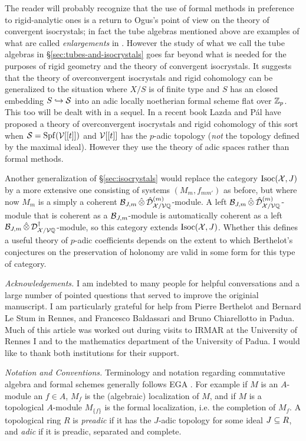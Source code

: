 \documentclass{article}
\theoremstyle{change}
\numberwithin{equation}{subsubsection}
\begin{document}
The reader will probably recognize that the use of formal methods in
preference to rigid-analytic ones is a return to Ogus's point of view
on the theory of convergent isocrystals; in fact the tube algebras
mentioned above are examples of what are called \textit{enlargements}
in \cite{ogus:1984}. However the study of what we call the tube
algebras in \S\ref{sec:tubes-and-isocrystals} goes far beyond what is
needed for the purposes of rigid geometry and the theory of convergent
isocrystals. It suggests that the theory of overconvergent isocrystals
and rigid cohomology can be generalized to the situation where $X/S$
is of finite type and $S$ has an closed embedding $S\hookrightarrow{\cal S}$ into an
adic locally noetherian formal scheme flat over ${\mathbb Z}_p$. This too will
be dealt with in a sequel. In a recent book \cite{lazda-pal:2016}
Lazda and P\'al have proposed a theory of overconvergent isocrystals
and rigid cohomology of this sort when ${\cal S}={\operatorname{Spf}({{\cal V}[[t]]})}$ and
${\cal V}[[t]]$ has the $p$-adic topology (\textit{not} the topology defined
by the maximal ideal). However they use the theory of adic spaces
rather than formal methods.

Another generalization of \S\ref{sec:isocrystals} would replace the
category $\mathrm{Isoc}({\cal X},J)$ by a more extensive one consisting of systems
$(M_m,f_{mm'})$ as before, but where now $M_m$ is a simply a coherent
${\cal B}_{J,m}\mathop{\hat\otimes}{\hat{\cal D}}^{({m})}_{{\cal X}/{\cal V}{\mathbb Q}}$-module. A left
${\cal B}_{J,m}\mathop{\hat\otimes}{\hat{\cal D}}^{({m})}_{{\cal X}/{\cal V}{\mathbb Q}}$-module that is coherent as a
${\cal B}_{J,m}$-module is automatically coherent as a left
${\cal B}_{J,m}\mathop{\hat\otimes}{\cal D}^\dagger_{{\cal X}/{\cal V}{\mathbb Q}}$-module, so this category extends
$\mathrm{Isoc}({\cal X},J)$. Whether this defines a useful theory of $p$-adic
coefficients depends on the extent to which Berthelot's conjectures on
the preservation of holonomy are valid in some form for this type of
category.

\bigskip

\noindent\textit{Acknowledgements.} 
I am indebted to many people for helpful conversations and a large
number of pointed questions that served to improve the originial
manuscript. I am particularly grateful for help from Pierre Berthelot
and Bernard Le Stum in Rennes, and Francesco Baldassari and Bruno
Chiarellotto in Padua. Much of this article was worked out during
visits to IRMAR at the University of Rennes I and to the mathematics
department of the University of Padua. I would like to thank both
institutions for their support.  \bigskip

\noindent\textit{Notation and Conventions.} 
Terminology and notation regarding commutative algebra and formal
schemes generally follows EGA \cite{EGA}. For example if $M$ is an
$A$-module an $f\in A$, $M_f$ is the (algebraic) localization of $M$,
and if $M$ is a topological $A$-module $M_{\{f\}}$ is the formal
localization, i.e. the completion of $M_f$. A topological ring $R$ is
\textit{preadic} if it has the $J$-adic topology for some ideal
$J\subseteq R$, and \textit{adic} if it is preadic, separated and
complete.
\end{document}
